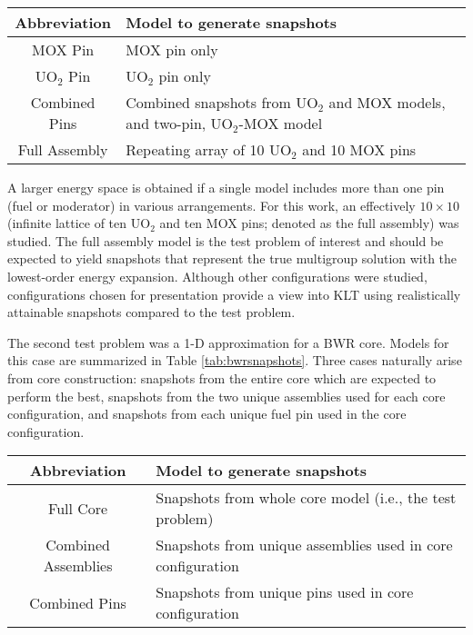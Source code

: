 \documentclass[5p,times,twocolumn,10pt]{elsarticle}
\begin{document}
  \begin{table*}[htb]
    \centering
    \caption{Summary of models used for snapshot generation for 10-pin test case}
    \begin{tabular}{c | l}\toprule
      Abbreviation    & Model to generate snapshots \\ \midrule
      MOX Pin         & MOX pin only \\
      UO$_2$ Pin      & UO$_2$ pin only \\
      Combined Pins   & Combined snapshots from UO$_2$ and MOX models, and two-pin, UO$_2$-MOX model \\
      Full Assembly   & Repeating array of 10 UO$_2$ and 10 MOX pins \\
      \bottomrule
    \end{tabular}
    \label{tab:snapshots}
  \end{table*}
  
  A larger energy space is obtained if a single model includes more than one pin (fuel or moderator) 
  in various arrangements.  For this work, an effectively $10\times 10$ (infinite lattice of ten UO$_2$ and ten MOX pins; 
  denoted as the full assembly) was studied.  The full assembly model
  is the test problem of interest and should be expected to yield snapshots that represent the true multigroup
  solution with the lowest-order energy expansion.  Although other configurations were studied, configurations chosen for presentation provide
  a view into KLT using realistically attainable snapshots compared to the test problem.
  
  The second test problem was a 1-D approximation for a BWR core.  Models for this case are summarized in 
  Table \ref{tab:bwrsnapshots}.  Three cases naturally arise from core construction: snapshots
  from the entire core which are expected to perform the best, snapshots from the two unique
  assemblies used for each core configuration, and snapshots from each unique fuel pin used in the
  core configuration.  
  
  \begin{table*}[htb]
    \centering
    \caption{Summary of models used for snapshot generation for BWR test case}
    \begin{tabular}{c | l}\toprule
      Abbreviation         & Model to generate snapshots \\ \midrule
      Full Core            & Snapshots from whole core model (i.e., the test problem) \\
      Combined Assemblies  & Snapshots from unique assemblies used in core configuration \\
      Combined Pins        & Snapshots from unique pins used in core configuration \\
      \bottomrule
    \end{tabular}
    \label{tab:bwrsnapshots}
  \end{table*}
  
\end{document}

